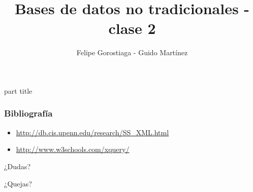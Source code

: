 \documentclass[obeyspaces,spaces,hyphens,handout]{beamer}
\begin{document}
\title{Bases de datos no tradicionales - clase 2}
\author{Felipe Gorostiaga - Guido Martínez}

\begin{frame}
  \titlepage
\end{frame}

\AtBeginSection{\frame{\sectionpage}}

{
	\begin{centering}
	\begin{beamercolorbox}[sep=12pt,center]{part title}
	\bf{\insertsection}\par
	\end{beamercolorbox}
	\end{centering}
}

\newcommand{\dquote}{\texttt{\char`\"}}









\begin{frame}
\frametitle{Bibliografía}
\begin{itemize}
	\footnotesize
	\item \url{http://db.cis.upenn.edu/research/SS\_XML.html}
	\item \url{http://www.w3schools.com/xquery/}
\end{itemize}
\end{frame}

\begin{frame}
\begin{center}
	¿Dudas?
	\pause

	¿Quejas?
\end{center}
\end{frame}
\end{document}
